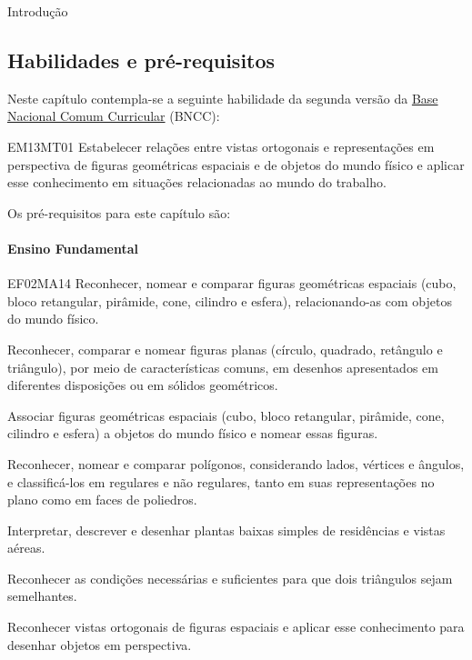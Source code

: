 \begin{apresentacao}{Introdução}

\subsection{Habilidades e pré-requisitos}
Neste capítulo contempla-se a seguinte habilidade da segunda versão da \href{http://historiadabncc.mec.gov.br/documentos/bncc-2versao.revista.pdf}{Base Nacional Comum Curricular} (BNCC):

\begin{habilities}{EM13MT01}
Estabelecer relações entre vistas ortogonais e representações em perspectiva de figuras geométricas espaciais e de objetos do mundo físico e aplicar esse conhecimento em situações relacionadas ao mundo do trabalho.
\end{habilities}

Os pré-requisitos para este capítulo são:

\paragraph{Ensino Fundamental}
\begin{habilities}{EF02MA14}
Reconhecer, nomear e comparar figuras geométricas espaciais (cubo, bloco retangular, pirâmide, cone, cilindro e esfera), relacionando-as com objetos do mundo físico.

Reconhecer, comparar e nomear figuras planas (círculo, quadrado, retângulo e triângulo), por meio de características comuns, em desenhos apresentados em diferentes disposições ou em sólidos geométricos.

Associar figuras geométricas espaciais (cubo, bloco retangular, pirâmide, cone, cilindro e esfera) a objetos do mundo físico e nomear essas figuras.

Reconhecer, nomear e comparar polígonos, considerando lados, vértices e ângulos, e classificá-los em regulares e não regulares, tanto em suas representações no plano como em faces de poliedros.

Interpretar, descrever e desenhar plantas baixas simples de residências e vistas aéreas.

Reconhecer as condições necessárias e suficientes para que dois triângulos sejam semelhantes.

Reconhecer vistas ortogonais de figuras espaciais e aplicar esse conhecimento para desenhar objetos em perspectiva.
\end{habilities}



\end{apresentacao}
